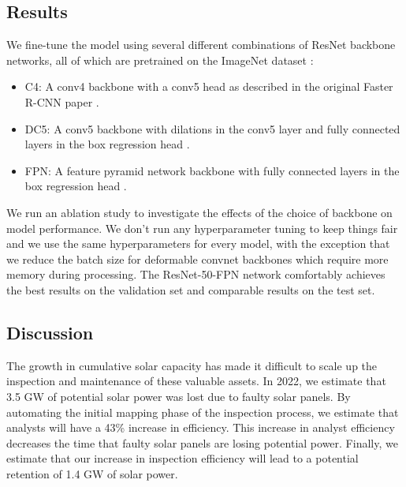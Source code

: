 

\subsection{Results}
We fine-tune the model using several different combinations of ResNet backbone networks, all of which are pretrained on the ImageNet dataset \citep{imagenet_cvpr09}:

\begin{itemize}
    \item C4: A conv4 backbone with a conv5 head as described in the original Faster R-CNN paper \citep{FasterRCNN}.
    \item DC5: A conv5 backbone with dilations in the conv5 layer and fully connected layers in the box regression head \citep{DC}. 
    \item FPN: A feature pyramid network backbone with fully connected layers in the box regression head \citep{FPN}.
\end{itemize}

We run an ablation study to investigate the effects of the choice of backbone on model performance. We don’t run any hyperparameter tuning to keep things fair and we use the same hyperparameters for every model, with the exception that we reduce the batch size for deformable convnet backbones which require more memory during processing. The ResNet-50-FPN network comfortably achieves the best results on the validation set and comparable results on the test set.

\subsection{Discussion}
The growth in cumulative solar capacity has made it difficult to scale up the inspection and maintenance of these valuable assets. In 2022, we estimate that 3.5 GW of potential solar power was lost due to faulty solar panels. By automating the initial mapping phase of the inspection process, we estimate that analysts will have a 43\% increase in efficiency. This increase in analyst efficiency decreases the time that faulty solar panels are losing potential power. Finally, we estimate that our increase in inspection efficiency will lead to a potential retention of 1.4 GW of solar power.

%